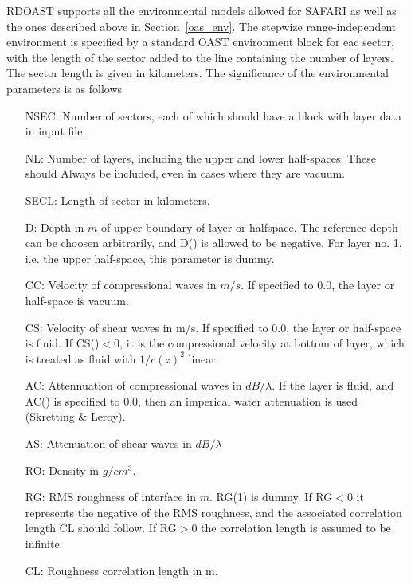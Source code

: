 RDOAST supports all the environmental models allowed for SAFARI as well as the
ones described above in Section~\ref{oas_env}.  The stepwize
range-independent environment is specified by a standard OAST
environment block for eac sector, with the length of the sector added
to the line containing the number of layers. The sector length is
given in kilometers. The significance of
the environmental parameters is as follows
\begin{itemize}	
		\item[NSEC:] Number of sectors, each of which should
		have a block with layer data in input file.
		\item[NL:]	Number of layers, including the upper and lower
		half-spaces. These should Always be included,
		even in cases where they are vacuum.
		\item[SECL:] Length of sector in kilometers.

		\item[D:]	Depth in $m$ of upper boundary of layer or
		halfspace. The reference depth can be choosen
		arbitrarily, and D() is allowed to be negative.
		For layer no. 1, i.e. the upper half-space, this
     		parameter is dummy.

		\item[CC:]	Velocity of compressional waves in $m/s$.
        	If specified to 0.0, the layer or half-space is
		vacuum.

		\item[CS:]	Velocity of shear waves in m/s.
 		If specified to 0.0, the layer or half-space is fluid.
                If CS()$< 0$, it is the compressional velocity at bottom of
		layer, which is treated as fluid with $1/c(z)^{2}$ linear.

		\item[AC:]   Attennuation of compressional waves in 
		$dB/\lambda$. If the layer is fluid, and AC() is specified to
		0.0, then an imperical water attenuation is
		used (Skretting \& Leroy).

		\item[AS:]   Attenuation of shear waves in $dB/\lambda$

		\item[RO:]   Density in $g/cm^{3}$.

		\item[RG:]  RMS roughness of interface in $m$. RG(1) is dummy. If RG$<0$ it represents the negative of the RMS roughness, and the associated correlation length CL should follow. If RG$>0$ the correlation length is assumed to be infinite.
		\item[CL:] Roughness correlation length in m. 
		\end{itemize}


